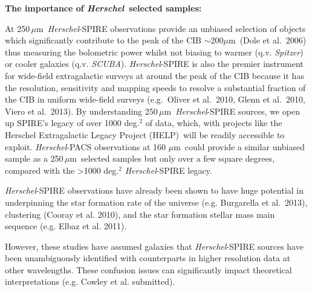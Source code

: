\documentclass[12pt,a4paper]{article}
\newcommand{\herschel}{{\it Herschel}}
\newcommand{\spitzer}{{\it Spitzer}}
\newcommand{\micron}{$\mu$m}
\begin{document}
{\bf The importance of \herschel\ selected samples: }
%

At 250\,\micron\, \herschel-SPIRE observations provide an unbiased selection of objects which significantly contribute to the peak of the CIB $\sim$200\micron\ (Dole et al.\ 2006) thus measuring the bolometric power whilst not biasing to warmer (q.v. \spitzer) or cooler galaxies (q.v. {\it SCUBA}).  \herschel-SPIRE is also the premier instrument for
wide-field extragalactic surveys at around the peak of the CIB because it has the
resolution, sensitivity and mapping speeds to resolve a substantial
fraction of the CIB in
uniform wide-field surveys (e.g.\ Oliver et al.\ 2010, Glenn et al.\
2010, Viero et al.\ 2013). By understanding 250\,\micron\, \herschel-SPIRE sources, we open up SPIRE's legacy of over 1000 deg.$^2$ of data, which, with projects like the Herschel Extragalactic Legacy Project (HELP)\protect\footnotemark \, will be readily accessible to exploit. \herschel-PACS observations at 160 \micron\ could provide a similar unbiased sample as a 250\,\micron\, selected samples but only over a few square degrees, compared with the \textgreater 1000 deg.$^2$ \herschel-SPIRE legacy.

\protect{}

\herschel-SPIRE observations have already been shown to have huge potential in underpinning the star formation rate of the universe (e.g. Burgarella et al.\ 2013), clustering (Cooray et al. 2010), and the star formation stellar mass main sequence (e.g. Elbaz et al. 2011). 

However, these studies have assumed galaxies that \herschel-SPIRE sources have been unambiguously identified with counterparts in higher resolution data at other wavelengths. These confusion issues can significantly impact theoretical interpretations (e.g. Cowley et al. submitted).
\end{document}
